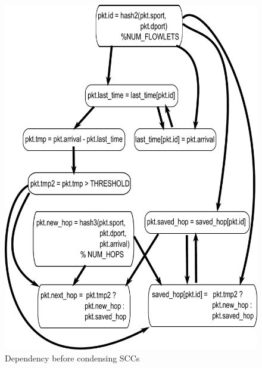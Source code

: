 \begin{figure}[!t]
\begin{minipage}{0.5\textwidth}
  \includegraphics[width=\columnwidth]{deps.pdf}
  \caption{Dependency before condensing SCCs}
  \label{fig:partitioning_before}
\end{minipage}
%
\vrule\quad
%
\begin{minipage}{0.5\textwidth}

\end{minipage}
\end{figure}
